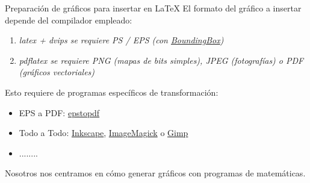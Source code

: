 \documentclass{beamer}
\begin{document}
\begin{frame}{Preparaci\'on de gr\'aficos para insertar en \LaTeX}
El formato del gr\'afico a insertar depende del compilador empleado:
\begin{enumerate}
\item \it{latex + dvips}  se requiere PS / EPS {\scriptsize(con \href{http://tex.stackexchange.com/questions/133786/no-boundingbox-error-message}{BoundingBox})}
\item \it {pdflatex} se requiere PNG {\scriptsize(mapas de bits simples)}, JPEG {\scriptsize(fotograf\'ias)} o PDF {\scriptsize(gr\'aficos vectoriales)}
\end{enumerate}

\vspace{0.5cm}
Esto requiere de programas espec\'ificos de transformaci\'on:
\begin{itemize}
\item {\sc EPS a PDF}: \href{http://tug.org/epstopdf/}{epstopdf}
\item {\sc Todo a Todo}: \href{http://www.inkscape.org/es/}{Inkscape}, 
\href{http://www.imagemagick.org}{ImageMagick} o \href{http://www.gimp.org/}{Gimp}
\item ........
\end{itemize}
Nosotros nos centramos en c\'omo generar gr\'aficos con programas de matem\'aticas.
\end{frame}
\end{document}
